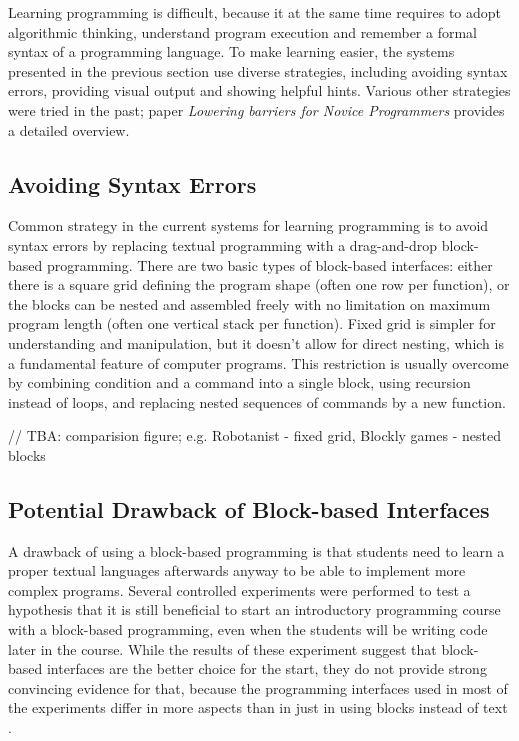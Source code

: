 \documentclass[
    digital,    %
    oneside,    %
    color,
    11pt,
    nocover,
    notable,
    nolof,
    nolot,
    final
]{fithesis3}
\begin{document}
Learning programming is difficult,
  because it at the same time requires
  to adopt algorithmic thinking,
  understand program execution
  and remember a formal syntax of a programming language.
To make learning easier,
  the systems presented in the previous section use diverse strategies,
  including avoiding syntax errors,
  providing visual output
  and showing helpful hints.
Various other strategies were tried in the past;
paper \emph{Lowering barriers for Novice Programmers}
  \cite{lowering-barriers}
  provides a detailed overview.


\subsection{Avoiding Syntax Errors}
\label{sec:avoiding-syntax-errors}

Common strategy in the current systems for learning programming is to avoid syntax errors
  by replacing textual programming with a drag-and-drop block-based programming.
There are two basic types of block-based interfaces:
  either there is a square grid defining the program shape
  (often one row per function),
  or the blocks can be nested and assembled freely with no limitation on maximum program length
  (often one vertical stack per function).
Fixed grid is simpler for understanding and manipulation,
  but it doesn’t allow for direct nesting,
  which is a fundamental feature of computer programs.
This restriction is usually overcome by
  combining condition and a command into a single block,
  using recursion instead of loops,
  and replacing nested sequences of commands by a new function.

// TBA: comparision figure; e.g. Robotanist - fixed grid, Blockly games - nested blocks


\subsection{Potential Drawback of Block-based Interfaces}
\label{sec:potential-drawback-of-block-based-interfaces}
A drawback of using a block-based programming
  is that students need to learn a proper textual languages afterwards anyway
  to be able to implement more complex programs.
Several controlled experiments were performed to test a hypothesis
  that it is still beneficial to start an introductory programming course
  with a block-based programming,
  even when the students will be writing code later in the course.
While the results of these experiment suggest that block-based interfaces
  are the better choice for the start,
  they do not provide strong convincing evidence for that,
  because the programming interfaces used in most of the experiments differ in more aspects
  than in just in using blocks instead of text
  \cite{comparing-textual-and-block-interfaces}.
\end{document}
